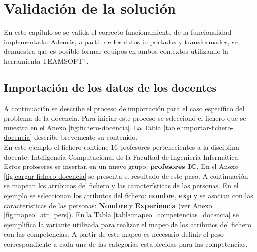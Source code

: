 \chapter{Validación de la solución}\label{chap:3}

En este capítulo se se valida el correcto funcionamiento de la funcionalidad implementada. Además, a partir de los datos importados y transformados, se demuestra que es posible formar equipos en ambos contextos utilizando la herramienta TEAMSOFT$^+$.

\section{Importación de los datos de los docentes}\label{sec:impo_docencia}
A continuación se describe el proceso de importación para el caso específico del problema de la docencia. Para iniciar este proceso se seleccionó el fichero que se muestra en el Anexo \ref{fig:fichero-docencia}. La Tabla \ref{table:importar-fichero-docencia} describe brevemente su contenido.\\

En este ejemplo el fichero contiene 16 profesores pertenecientes a la disciplina docente: Inteligencia Computacional de la Facultad de Ingeniería Informática. Estos profesores se insertan en un nuevo grupo: \textbf{profesores IC}. En el Anexo \ref{fig:cargar-fichero-docencia} se presenta el resultado de este paso. A continuación se mapean los atributos del fichero y las características de las personas. En el ejemplo se seleccionan los atributos del fichero: \textbf{nombre}, \textbf{exp} y se asocian con las características de las personas: \textbf{Nombre} y \textbf{Experiencia} (ver Anexo \ref{fig:mapeo_atr_pers}). En la Tabla \ref{table:mapeo_competencias_docencia} se ejemplifica la variante utilizada para realizar el mapeo de los atributos del fichero con las competencias. A partir de este mapeo es necesario definir el peso correspondiente a cada una de las categorías establecidas para las competencias. 

